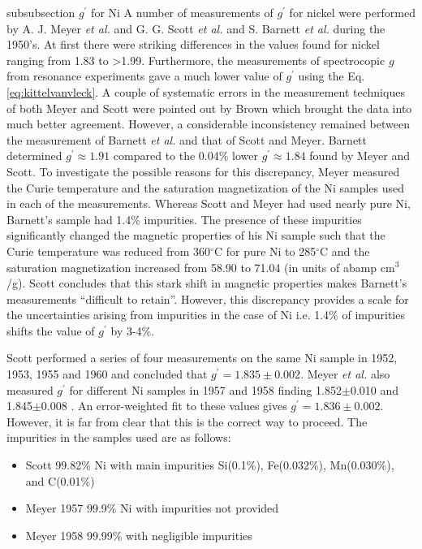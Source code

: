 \documentclass[12pt]{article}
\begin{document}
subsubsection{ $ g^{\prime}$ for Ni}
A number of measurements of $g^{\prime}$ for nickel were performed by A. J. Meyer {\it et al.} and G. G. Scott {\it et al.} and S. Barnett {\it et al.} during the 1950's. At first there were striking differences in the values found for nickel ranging from 1.83 to >1.99. Furthermore, the measurements of spectrocopic $g$ from resonance experiments gave a much lower value of $g^{\prime}$ using the Eq. \ref{eq:kittelvanvleck}. A couple of systematic errors in the measurement techniques of both Meyer and Scott were pointed out by Brown which brought the data into much better agreement\cite{Scott1962}. However, a considerable inconsistency remained between the measurement of Barnett {\it et al.} and that of Scott and Meyer. Barnett determined $g^{\prime}\approx1.91$ compared to the 0.04\% lower $g^{\prime}\approx1.84$ found by Meyer and Scott\cite{Meyer1961,Scott1962}. To investigate the possible reasons for this discrepancy, Meyer measured the Curie temperature and the saturation magnetization of the Ni samples used in each of the measurements. Whereas Scott and Meyer had used nearly pure Ni, Barnett's sample had 1.4\% impurities. The presence of these impurities significantly changed the magnetic properties of his Ni sample such that the Curie temperature was reduced from 360$^{\circ}$C for pure Ni to 285$^{\circ}$C and the saturation magnetization increased from 58.90 to 71.04 (in units of abamp cm$^3$/g)\cite{Scott1962}. Scott concludes that this stark shift in magnetic properties makes Barnett's measurements ``difficult to retain''\cite{Scott1962}. However, this discrepancy provides a scale for the uncertainties arising from impurities in the case of Ni i.e. 1.4\% of impurities shifts the value of $g^{\prime}$ by 3-4\%.

Scott performed a series of four measurements on the same Ni sample in 1952, 1953, 1955 and 1960 and concluded that $g^{\prime}=1.835\pm0.002$\cite{Scott1962}. Meyer {\it et al.} also measured $g^{\prime}$ for different Ni samples in 1957 and 1958 finding 1.852$\pm$0.010 and 1.845$\pm$0.008 \cite{Meyer1961}. An error-weighted fit to these values gives $g^{\prime}=1.836\pm0.002$. However, it is far from clear that this is the correct way to proceed. The impurities in the samples used are as follows:
\begin{itemize}
\item{Scott 99.82\% Ni with main impurities Si(0.1\%), Fe(0.032\%), Mn(0.030\%), and C(0.01\%)\cite{ScottSep1955}}
\item{Meyer 1957 99.9\% Ni with impurities not provided\cite{Meyer1957}}
\item{Meyer 1958 99.99\% with negligible impurities\cite{Meyer1961}}
\end{itemize}
\end{document}
